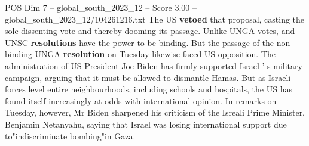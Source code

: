 \begin{textsample}{POS Dim 7 – global\_south\_2023\_12 – Score 3.00 – global\_south\_2023\_12/104261216.txt}
The US \textbf{vetoed} that proposal, casting the sole dissenting vote and thereby dooming its passage.
Unlike UNGA votes, and UNSC \textbf{resolutions} have the power to be binding.
But the passage of the non-binding UNGA \textbf{resolution} on Tuesday likewise faced US opposition.
The administration of US President Joe Biden has firmly supported Israel ' s military campaign, arguing that it must be allowed to dismantle Hamas.
But as Israeli forces level entire neighbourhoods, including schools and hospitals, the US has found itself increasingly at odds with international opinion.
In remarks on Tuesday, however, Mr Biden sharpened his criticism of the Isreali Prime Minister, Benjamin Netanyahu, saying that Israel was losing international support due to"indiscriminate bombing"in Gaza.

\end{textsample}
